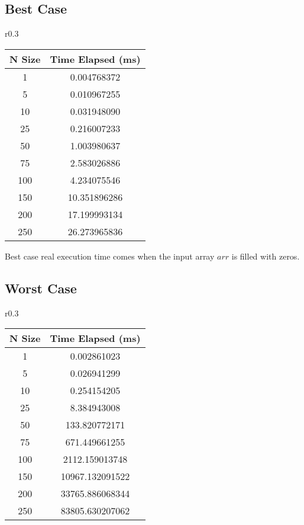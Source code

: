 \documentclass[10pt]{article}
\begin{document}
\subsection{Best Case}
\begin{wraptable}{r}{0.3\textwidth}
\centering
\begin{tabular}{|c|c|} 
 \hline
 N Size & Time Elapsed (ms) \\ 
 \hline
 1 & 0.004768372 \\
 \hline
 5 & 0.010967255 \\
 \hline
 10 & 0.031948090 \\
 \hline
 25 & 0.216007233 \\
 \hline
 50 & 1.003980637 \\
 \hline
 75 & 2.583026886 \\
 \hline
 100 & 4.234075546 \\
 \hline
 150 & 10.351896286 \\
 \hline
 200 & 17.199993134 \\
 \hline
 250 & 26.273965836 \\
 \hline
\end{tabular}
\end{wraptable}


\indent \indent Best case real execution time comes when the input array $arr$ is filled with zeros.  


\subsection{Worst Case}
\begin{wraptable}{r}{0.3\textwidth}
\centering
\begin{tabular}{|c|c|} 
 \hline
 N Size & Time Elapsed (ms) \\ 
 \hline
 1 & 0.002861023 \\
 \hline
 5 & 0.026941299 \\
 \hline
 10 & 0.254154205 \\
 \hline
 25 & 8.384943008 \\
 \hline
 50 & 133.820772171 \\
 \hline
 75 & 671.449661255 \\
 \hline
 100 & 2112.159013748 \\
 \hline
 150 & 10967.132091522 \\
 \hline
 200 & 33765.886068344 \\
 \hline
 250 & 83805.630207062 \\
 \hline
\end{tabular}
\end{wraptable}
\end{document}

